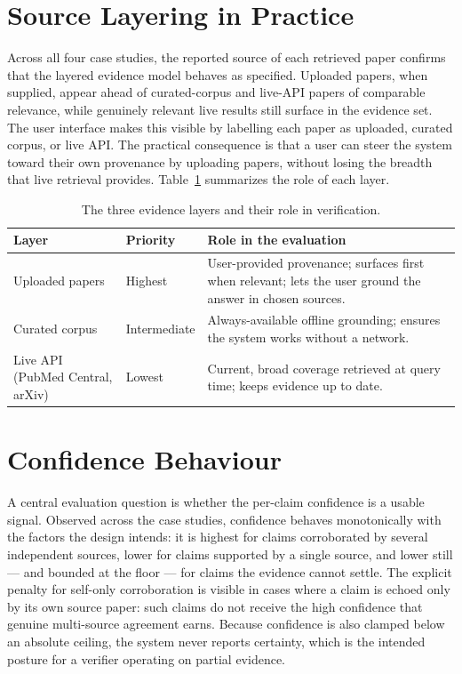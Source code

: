 \section{Source Layering in Practice }

Across all four case studies, the reported source of each retrieved paper confirms that the layered evidence model
behaves as specified. Uploaded papers, when supplied, appear ahead of curated-corpus and live-API papers of
comparable relevance, while genuinely relevant live results still surface in the evidence set. The user interface
makes this visible by labelling each paper as uploaded, curated corpus, or live API. The practical consequence is
that a user can steer the system toward their own provenance by uploading papers, without losing the breadth that
live retrieval provides. Table~\ref{tab:source-layers} summarizes the role of each layer.

\begin{table}[!htbp]
\centering
\small
\begin{tabularx}{0.96\textwidth}{>{\raggedright\arraybackslash}p{} >{\raggedright\arraybackslash}p{} >{\raggedright\arraybackslash}X}
\toprule
Layer & Priority & Role in the evaluation \\
\midrule
Uploaded papers & Highest & User-provided provenance; surfaces first when relevant; lets the user ground the answer in chosen sources. \\
Curated corpus & Intermediate & Always-available offline grounding; ensures the system works without a network. \\
Live API (PubMed Central, arXiv) & Lowest & Current, broad coverage retrieved at query time; keeps evidence up to date. \\
\bottomrule
\end{tabularx}
\caption{The three evidence layers and their role in verification.}
\label{tab:source-layers}
\end{table}

\section{Confidence Behaviour }

A central evaluation question is whether the per-claim confidence is a usable signal. Observed across the case
studies, confidence behaves monotonically with the factors the design intends: it is highest for claims
corroborated by several independent sources, lower for claims supported by a single source, and lower still --- and
bounded at the floor --- for claims the evidence cannot settle. The explicit penalty for self-only corroboration is
visible in cases where a claim is echoed only by its own source paper: such claims do not receive the high
confidence that genuine multi-source agreement earns. Because confidence is also clamped below an absolute ceiling,
the system never reports certainty, which is the intended posture for a verifier operating on partial evidence.

